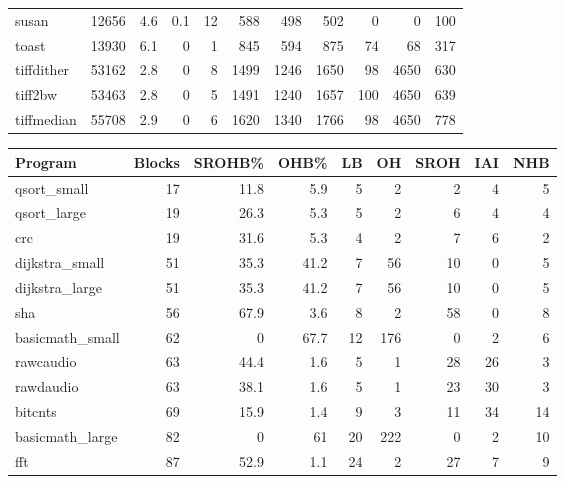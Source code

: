 \begin{tabular}{lrrrrrrrrrr}
 susan           &          12656 &      4.6 &    0.1 &   12 &    588 &        498 &          502 &     0 &     0 &   100 \\
 toast           &          13930 &      6.1 &    0   &    1 &    845 &        594 &          875 &    74 &    68 &   317 \\
 tiffdither      &          53162 &      2.8 &    0   &    8 &   1499 &       1246 &         1650 &    98 &  4650 &   630 \\
 tiff2bw         &          53463 &      2.8 &    0   &    5 &   1491 &       1240 &         1657 &   100 &  4650 &   639 \\
 tiffmedian      &          55708 &      2.9 &    0   &    6 &   1620 &       1340 &         1766 &    98 &  4650 &   778 \\
\hline
\end{tabular}\begin{tabular}{lrrrrrrrr}
\hline
 Program         &   Blocks &   SROHB\% &   OHB\% &   LB &   OH &   SROH &   IAI &   NHB \\
\hline
 qsort\_small     &       17 &     11.8 &    5.9 &    5 &    2 &      2 &     4 &     5 \\
 qsort\_large     &       19 &     26.3 &    5.3 &    5 &    2 &      6 &     4 &     4 \\
 crc             &       19 &     31.6 &    5.3 &    4 &    2 &      7 &     6 &     2 \\
 dijkstra\_small  &       51 &     35.3 &   41.2 &    7 &   56 &     10 &     0 &     5 \\
 dijkstra\_large  &       51 &     35.3 &   41.2 &    7 &   56 &     10 &     0 &     5 \\
 sha             &       56 &     67.9 &    3.6 &    8 &    2 &     58 &     0 &     8 \\
 basicmath\_small &       62 &      0   &   67.7 &   12 &  176 &      0 &     2 &     6 \\
 rawcaudio       &       63 &     44.4 &    1.6 &    5 &    1 &     28 &    26 &     3 \\
 rawdaudio       &       63 &     38.1 &    1.6 &    5 &    1 &     23 &    30 &     3 \\
 bitcnts         &       69 &     15.9 &    1.4 &    9 &    3 &     11 &    34 &    14 \\
 basicmath\_large &       82 &      0   &   61   &   20 &  222 &      0 &     2 &    10 \\
 fft             &       87 &     52.9 &    1.1 &   24 &    2 &     27 &     7 &     9 \\

\end{tabular}
